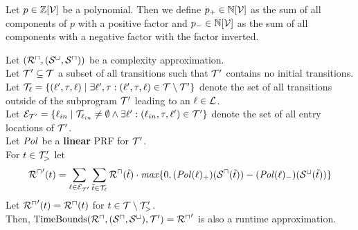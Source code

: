 \begin{definition}
  Let $p \in \mathbb{Z}[\mathcal{V}]$ be a polynomial.
  Then we define $p_+ \in \mathbb{N}[\mathcal{V}]$ as the sum of all components of $p$ with a positive factor and $p_- \in \mathbb{N}[\mathcal{V}]$ as the sum of all components with a negative factor with the factor inverted.
\end{definition}

\begin{theorem}[TimeBounds]
  Let $({\mathcal{R}^\sqcap}, ({\mathcal{S}^\sqcup}, {\mathcal{S}^\sqcap}))$ be a complexity approximation. \\
  Let $\mathcal{T}' \subseteq \mathcal{T}$ a subset of all transitions such that $\mathcal{T}'$ contains no initial transitions. \\
  Let $\mathcal{T}_{\ell} = \lbrace (\ell', \tau, \ell) \mid \exists \ell', \tau: (\ell', \tau, \ell) \in \mathcal{T} \setminus \mathcal{T}' \rbrace$ denote the set of all transitions outside of the subprogram $\mathcal{T}'$ leading to an $\ell \in \mathcal{L}$. \\
  Let $\mathcal{E}_{\mathcal{T}'} = \lbrace \ell_{in} \mid \mathcal{T}_{\ell_{in}} \neq \emptyset \wedge \exists \ell': (\ell_{in}, \tau, \ell') \in \mathcal{T}' \rbrace$ denote the set of all entry locations of $\mathcal{T}'$. \\
  Let $\mathit{Pol}$ be a \textbf{linear} PRF for $\mathcal{T}'$. \\
  For $t \in \mathcal{T}'_>$ let
  \[ {\mathcal{R}^\sqcap}'(t) = \sum_{\ell \in \mathcal{E}_{\mathcal{T}'}} \sum_{\tilde{t} \in \mathcal{T}_\ell} {\mathcal{R}^\sqcap}(\tilde{t}) \cdot \mathit{max} \lbrace 0, (\mathit{Pol}(\ell)_+)({\mathcal{S}^\sqcap}(\tilde{t})) - (\mathit{Pol}(\ell)_-)({\mathcal{S}^\sqcup}(\tilde{t})) \rbrace \]
  Let ${\mathcal{R}^\sqcap}'(t) = {\mathcal{R}^\sqcap}(t)$ for $t \in \mathcal{T} \setminus \mathcal{T}'_>$. \\
  Then, $\text{TimeBounds}({\mathcal{R}^\sqcap}, ({\mathcal{S}^\sqcap}, {\mathcal{S}^\sqcup}), \mathcal{T}') = {\mathcal{R}^\sqcap}'$ is also a runtime approximation.
\end{theorem}
